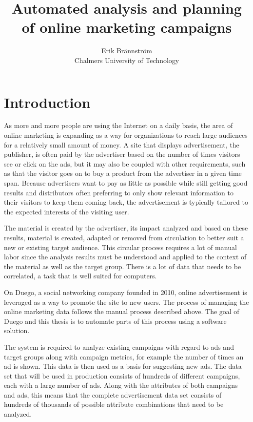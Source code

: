 \documentclass[10pt,twocolumn]{article}
\begin{document}
\title{Automated analysis and planning of online marketing campaigns}
\author{Erik Brännström\\
  Chalmers University of Technology}
\date{}
\maketitle

\section{Introduction}
As more and more people are using the Internet on a daily basis, the area of online marketing is expanding as a way for organizations to reach large audiences for a relatively small amount of money. A site that displays advertisement, the publisher, is often paid by the advertiser based on the number of times visitors see or click on the ads, but it may also be coupled with other requirements, such as that the visitor goes on to buy a product from the advertiser in a given time span. Because advertisers want to pay as little as possible while still getting good results and distributors often preferring to only show relevant information to their visitors to keep them coming back, the advertisement is typically tailored to the expected interests of the visiting user.

The material is created by the advertiser, its impact analyzed and based on these results, material is created, adapted or removed from circulation to better suit a new or existing target audience. This circular process requires a lot of manual labor since the analysis results must be understood and applied to the context of the material as well as the target group. There is a lot of data that needs to be correlated, a task that is well suited for computers.

On Duego, a social networking company founded in 2010, online advertisement is leveraged as a way to promote the site to new users. The process of managing the online marketing data follows the manual process described above. The goal of Duego and this thesis is to automate parts of this process using a software solution.

The system is required to analyze existing campaigns with regard to ads and target groups along with campaign metrics, for example the number of times an ad is shown. This data is then used as a basis for suggesting new ads. The data set that will be used in production consists of hundreds of different campaigns, each with a large number of ads. Along with the attributes of both campaigns and ads, this means that the complete advertisement data set consists of hundreds of thousands of possible attribute combinations that need to be analyzed.
\end{document}
